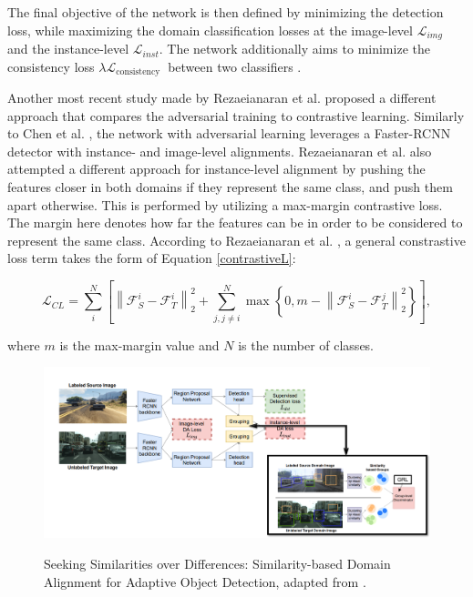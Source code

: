 The final objective of the network is then defined by minimizing the detection loss, while maximizing the domain classification losses at the image-level $\mathcal{L}_{img}$ and the instance-level $\mathcal{L}_{inst}$. The network additionally aims to minimize the consistency loss $\lambda \mathcal{L}_{\text {consistency }}$ between two classifiers \cite{Chen2018}.

Another most recent study made by Rezaeianaran et al. \cite{Rezaeianaran2021} proposed a different approach that compares the adversarial training to contrastive learning. Similarly to Chen et al. \cite{Chen2018}, the network with adversarial learning leverages a Faster-RCNN detector with instance- and image-level alignments. Rezaeianaran et al. also attempted a different approach for instance-level alignment by pushing the features closer in both domains if they represent the same class, and push them apart otherwise. This is performed by utilizing a max-margin contrastive loss. The margin here denotes how far the features can be in order to be considered to represent the same class. According to Rezaeianaran et al. \cite{Rezaeianaran2021}, a general constrastive loss term takes the form of Equation \ref{contrastiveL}:

\begin{equation}
\mathcal{L}_{C L}=\sum_{i}^{N}\left[\left\|\mathcal{F}_{S}^{i}-\mathcal{F}_{T}^{i}\right\|_{2}^{2}+\sum_{j, j \neq i}^{N} \max \left\{0, m-\left\|\mathcal{F}_{S}^{i}-\mathcal{F}_{T}^{j}\right\|_{2}^{2}\right\}\right],
\label{contrastiveL} 
\end{equation}

where $m$ is the max-margin value and $N$ is the number of classes. 

\begin{figure}[htb]
	\begin{center}
		\includegraphics[width=16cm]{./VisGa.png}
	\end{center}
	\caption{Seeking Similarities over Differences: Similarity-based Domain Alignment for Adaptive Object Detection, adapted from \cite{Rezaeianaran2021}.}
	\begin{center}
		\label{visga}
	\end{center}
\end{figure}


